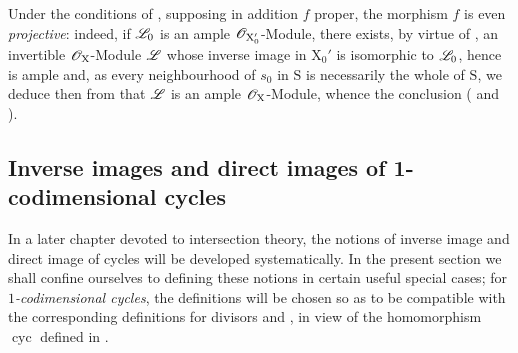 \begin{remark}[21.9.13]
\label{IV.21.9.13}
Under the conditions of , supposing in addition $f$ proper, the morphism $f$ is even \emph{projective}:
indeed, if $\mathscr{L}_0$ is an ample $\mathscr{O}_{\mathrm{X}'_0}$-Module, there exists, by virtue of , an invertible $\mathscr{O}_\mathrm{X}$-Module $\mathscr{L}$ whose inverse image in $\mathrm{X}_0'$ is isomorphic to $\mathscr{L}_0$, hence is ample and, as every neighbourhood of $s_0$ in $\mathrm{S}$ is necessarily the whole of $\mathrm{S}$, we deduce then from  that $\mathscr{L}$ is an ample $\mathscr{O}_\mathrm{X}$-Module, whence the conclusion ( and ).
\end{remark}
\subsection{Inverse images and direct images of 1-codimensional cycles}
\label{subsection:IV.21.10}

In a later chapter devoted to intersection theory, the notions of inverse image and direct image of cycles will be developed systematically.
In the present section we shall confine ourselves to defining these notions in certain useful special cases; for \emph{$1$-codimensional cycles}, the definitions will be chosen so as to be compatible with the corresponding definitions for divisors  and , in view of the homomorphism $\operatorname{cyc}$ defined in .


